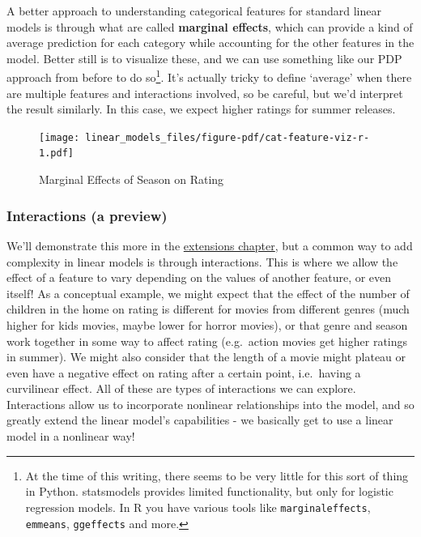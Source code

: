 \documentclass[
  letterpaper,
]{krantz}
\begin{document}
A better approach to understanding categorical features for standard
linear models is through what are called \textbf{marginal effects},
which can provide a kind of average prediction for each category while
accounting for the other features in the model. Better still is to
visualize these, and we can use something like our PDP approach from
before to do so\footnote{At the time of this writing, there seems to be
  very little for this sort of thing in Python. statsmodels provides
  limited functionality, but only for logistic regression models. In R
  you have various tools like \texttt{marginaleffects},
  \texttt{emmeans}, \texttt{ggeffects} and more.}. It's actually tricky
to define `average' when there are multiple features and interactions
involved, so be careful, but we'd interpret the result similarly. In
this case, we expect higher ratings for summer releases.

\begin{figure}

{\centering \texttt{[image: linear\_models\_files/figure-pdf/cat-feature-viz-r-1.pdf]}

}

\caption{Marginal Effects of Season on Rating}

\end{figure}

\subsubsection{Interactions (a preview)}\label{interactions-a-preview}

We'll demonstrate this more in the \hyperref[extensions]{extensions
chapter}, but a common way to add complexity in linear models is through
interactions. This is where we allow the effect of a feature to vary
depending on the values of another feature, or even itself! As a
conceptual example, we might expect that the effect of the number of
children in the home on rating is different for movies from different
genres (much higher for kids movies, maybe lower for horror movies), or
that genre and season work together in some way to affect rating
(e.g.~action movies get higher ratings in summer). We might also
consider that the length of a movie might plateau or even have a
negative effect on rating after a certain point, i.e.~having a
curvilinear effect. All of these are types of interactions we can
explore. Interactions allow us to incorporate nonlinear relationships
into the model, and so greatly extend the linear model's capabilities -
we basically get to use a linear model in a nonlinear way!
\end{document}

